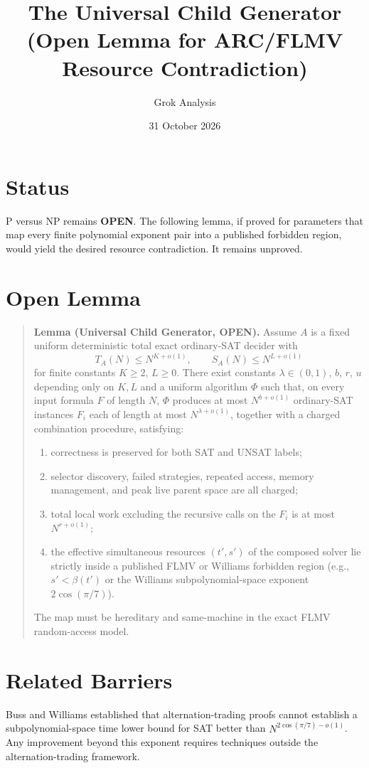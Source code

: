 \documentclass[11pt]{article}
\title{The Universal Child Generator\\(Open Lemma for ARC/FLMV Resource Contradiction)}
\author{Grok Analysis}
\date{31 October 2026}
\begin{document}
\maketitle

\section{Status}
P versus NP remains \textbf{OPEN}. The following lemma, if proved for parameters that map every finite polynomial exponent pair into a published forbidden region, would yield the desired resource contradiction. It remains unproved.

\section{Open Lemma}
\begin{quote}
\textbf{Lemma (Universal Child Generator, OPEN).}
Assume \(A\) is a fixed uniform deterministic total exact ordinary-SAT decider with
\[
T_A(N)\le N^{K+o(1)},\qquad S_A(N)\le N^{L+o(1)}
\]
for finite constants \(K\ge 2\), \(L\ge 0\). There exist constants \(\lambda\in(0,1)\), \(b\), \(r\), \(u\) depending only on \(K,L\) and a uniform algorithm \(\Phi\) such that, on every input formula \(F\) of length \(N\), \(\Phi\) produces at most \(N^{b+o(1)}\) ordinary-SAT instances \(F_i\) each of length at most \(N^{\lambda+o(1)}\), together with a charged combination procedure, satisfying:
\begin{enumerate}
\item correctness is preserved for both SAT and UNSAT labels;
\item selector discovery, failed strategies, repeated access, memory management, and peak live parent space are all charged;
\item total local work excluding the recursive calls on the \(F_i\) is at most \(N^{r+o(1)}\);
\item the effective simultaneous resources \((t',s')\) of the composed solver lie strictly inside a published FLMV or Williams forbidden region (e.g., \(s'<\beta(t')\) or the Williams subpolynomial-space exponent \(2\cos(\pi/7)\)).
\end{enumerate}
The map must be hereditary and same-machine in the exact FLMV random-access model.
\end{quote}

\section{Related Barriers}
Buss and Williams established that alternation-trading proofs cannot establish a subpolynomial-space time lower bound for SAT better than \(N^{2\cos(\pi/7)-o(1)}\). Any improvement beyond this exponent requires techniques outside the alternation-trading framework.
\end{document}
